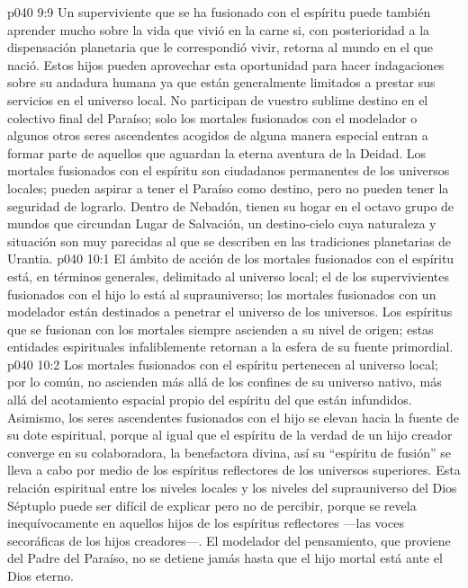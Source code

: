\vs p040 9:9 \pc Un superviviente que se ha fusionado con el espíritu puede también aprender mucho sobre la vida que vivió en la carne si, con posterioridad a la dispensación planetaria que le correspondió vivir, retorna al mundo en el que nació. Estos hijos pueden aprovechar esta oportunidad para hacer indagaciones sobre su andadura humana ya que están generalmente limitados a prestar sus servicios en el universo local. No participan de vuestro sublime destino en el colectivo final del Paraíso; solo los mortales fusionados con el modelador o algunos otros seres ascendentes acogidos de alguna manera especial entran a formar parte de aquellos que aguardan la eterna aventura de la Deidad. Los mortales fusionados con el espíritu son ciudadanos permanentes de los universos locales; pueden aspirar a tener el Paraíso como destino, pero no pueden tener la seguridad de lograrlo. Dentro de Nebadón, tienen su hogar en el octavo grupo de mundos que circundan Lugar de Salvación, un destino\hyp{}cielo cuya naturaleza y situación son muy parecidas al que se describen en las tradiciones planetarias de Urantia.
\vs p040 10:1 El ámbito de acción de los mortales fusionados con el espíritu está, en términos generales, delimitado al universo local; el de los supervivientes fusionados con el hijo lo está al suprauniverso; los mortales fusionados con un modelador están destinados a penetrar el universo de los universos. Los espíritus que se fusionan con los mortales siempre ascienden a su nivel de origen; estas entidades espirituales infaliblemente retornan a la esfera de su fuente primordial.
\vs p040 10:2 Los mortales fusionados con el espíritu pertenecen al universo local; por lo común, no ascienden más allá de los confines de su universo nativo, más allá del acotamiento espacial propio del espíritu del que están infundidos. Asimismo, los seres ascendentes fusionados con el hijo se elevan hacia la fuente de su dote espiritual, porque al igual que el espíritu de la verdad de un hijo creador converge en su colaboradora, la benefactora divina, así su “espíritu de fusión” se lleva a cabo por medio de los espíritus reflectores de los universos superiores. Esta relación espiritual entre los niveles locales y los niveles del suprauniverso del Dios Séptuplo puede ser difícil de explicar pero no de percibir, porque se revela inequívocamente en aquellos hijos de los espíritus reflectores ---las voces secoráficas de los hijos creadores---. El modelador del pensamiento, que proviene del Padre del Paraíso, no se detiene jamás hasta que el hijo mortal está ante el Dios eterno.
